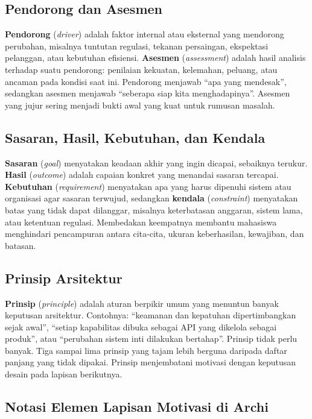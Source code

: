 \subsection{Pendorong dan Asesmen}

\textbf{Pendorong} (\emph{driver}) adalah faktor internal atau eksternal yang
mendorong perubahan, misalnya tuntutan regulasi, tekanan persaingan, ekspektasi
pelanggan, atau kebutuhan efisiensi. \textbf{Asesmen} (\emph{assessment}) adalah
hasil analisis terhadap suatu pendorong: penilaian kekuatan, kelemahan, peluang,
atau ancaman pada kondisi saat ini. Pendorong menjawab ``apa yang mendesak'',
sedangkan asesmen menjawab ``seberapa siap kita menghadapinya''. Asesmen yang
jujur sering menjadi bukti awal yang kuat untuk rumusan masalah.

\subsection{Sasaran, Hasil, Kebutuhan, dan Kendala}

\textbf{Sasaran} (\emph{goal}) menyatakan keadaan akhir yang ingin dicapai,
sebaiknya terukur. \textbf{Hasil} (\emph{outcome}) adalah capaian konkret yang
menandai sasaran tercapai. \textbf{Kebutuhan} (\emph{requirement}) menyatakan
apa yang harus dipenuhi sistem atau organisasi agar sasaran terwujud,
sedangkan \textbf{kendala} (\emph{constraint}) menyatakan batas yang tidak
dapat dilanggar, misalnya keterbatasan anggaran, sistem lama, atau ketentuan
regulasi. Membedakan keempatnya membantu mahasiswa menghindari pencampuran
antara cita-cita, ukuran keberhasilan, kewajiban, dan batasan.

\subsection{Prinsip Arsitektur}

\textbf{Prinsip} (\emph{principle}) adalah aturan berpikir umum yang menuntun
banyak keputusan arsitektur. Contohnya: ``keamanan dan kepatuhan dipertimbangkan
sejak awal'', ``setiap kapabilitas dibuka sebagai API yang dikelola sebagai
produk'', atau ``perubahan sistem inti dilakukan bertahap''. Prinsip tidak perlu
banyak. Tiga sampai lima prinsip yang tajam lebih berguna daripada daftar
panjang yang tidak dipakai. Prinsip menjembatani motivasi dengan keputusan
desain pada lapisan berikutnya.

\subsection{Notasi Elemen Lapisan Motivasi di Archi}

